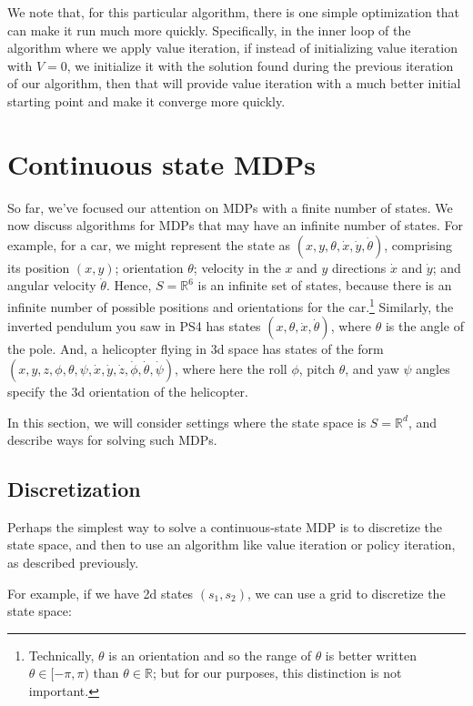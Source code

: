 We note that, for this particular algorithm, there is one simple optimization
that can make it run much more quickly. Specifically, in the inner loop
of the algorithm where we apply value iteration, if instead of initializing value
iteration with $V = 0$, we initialize it with the solution found during the previous
iteration of our algorithm, then that will provide value iteration with
a much better initial starting point and make it converge more quickly.

\chapter{Continuous state MDPs}
So far, we've focused our attention on MDPs with a finite number of states.
We now discuss algorithms for MDPs that may have an infinite number of
states. For example, for a car, we might represent the state as $(x,y,\theta, \dot{x}, \dot{y}, \dot{\theta})$,
comprising its position $(x,y)$; orientation $\theta$; velocity in the $x$ and $y$ directions
$\dot{x}$ and $\dot{y}$; and angular velocity $\dot{\theta}$. Hence, $S = \mathbb R^6$ is an infinite set of states,
because there is an infinite number of possible positions and orientations
for the car.\footnote{
Technically, $\theta$ is an orientation and so the range of $\theta$ is better written $\theta \in [-\pi,\pi)$ than
$\theta \in \mathbb R$; but for our purposes, this distinction is not important.} Similarly, the inverted pendulum you saw in PS4 has states
$(x,\theta, \dot{x}, \dot{\theta})$, where $\theta$ is the angle of the pole. And, a helicopter flying in 3d
space has states of the form $(x,y,z,\phi,\theta,\psi, \dot{x}, \dot{y}, \dot{z}, \dot{\phi}, \dot{\theta}, \dot{\psi})$, where here the roll
$\phi$, pitch $\theta$, and yaw $\psi$ angles specify the 3d orientation of the helicopter.

In this section, we will consider settings where the state space is $S = \mathbb R^d$,
and describe ways for solving such MDPs.

\section{Discretization}
Perhaps the simplest way to solve a continuous-state MDP is to discretize
the state space, and then to use an algorithm like value iteration or policy
iteration, as described previously.

For example, if we have 2d states $(s_1,s_2)$, we can use a grid to discretize
the state space:

